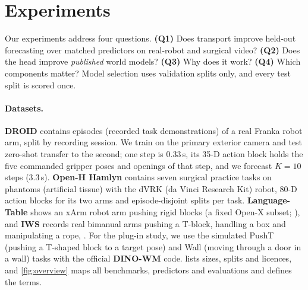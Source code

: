 \section{Experiments}
\label{sec:experiments}
\label{sec:setup}

Our experiments address four questions.
%
\textbf{(Q1)} Does transport improve held-out forecasting over matched predictors on real-robot and surgical video?
%
\textbf{(Q2)} Does the \ours{} head improve \emph{published} world models?
%
\textbf{(Q3)} Why does it work?
%
\textbf{(Q4)} Which components matter?
%
Model selection uses validation splits only, and every test split is scored once.

\paragraph{Datasets.}
\textbf{DROID} \citep{khazatsky2024droid} contains episodes (recorded task demonstrations) of a real Franka
robot arm, split by recording session.
%
We train on the primary exterior camera and test zero-shot transfer to the second; one step is 0.33\,s, its 35-D
action block holds the five commanded gripper poses and openings of that step, and we forecast $K{=}10$ steps (3.3\,s).
%
\textbf{Open-H Hamlyn} \citep{openh2026embodiment} contains seven surgical practice tasks on phantoms (artificial tissue)
with the dVRK (da Vinci Research Kit) robot, 80-D action blocks for its two arms and episode-disjoint splits per task.
%
\textbf{Language-Table} \citep{lynch2023interactive} shows an xArm robot arm pushing rigid blocks (a fixed Open-X
subset; \citealp{oneill2024openx}), and \textbf{IWS} \citep{wang2026iws,zhang2026rlawm} records real bimanual arms pushing a
T-block, handling a box and manipulating a rope, .
%
For the plug-in study, we use the simulated PushT (pushing a T-shaped block to a target pose) and Wall (moving through a
door in a wall) tasks with the official \textbf{DINO-WM} code.
%
 lists sizes, splits and licences, and \cref{fig:overview} maps all benchmarks, predictors and evaluations and defines the terms.

